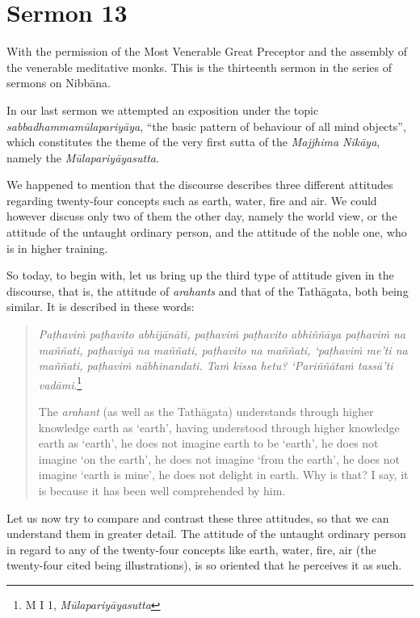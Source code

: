\chapter{Sermon 13}

\NibbanaOpeningQuote

With the permission of the Most Venerable Great Preceptor and the assembly of the venerable meditative monks. This is the thirteenth sermon in the series of sermons on Nibbāna.

In our last sermon we attempted an exposition under the topic \emph{sabbadhammamūlapariyāya}, ``the basic pattern of behaviour of all mind objects'', which constitutes the theme of the very first sutta of the \emph{Majjhima Nikāya}, namely the \emph{Mūlapariyāyasutta}.

We happened to mention that the discourse describes three different attitudes regarding twenty-four concepts such as earth, water, fire and air. We could however discuss only two of them the other day, namely the world view, or the attitude of the untaught ordinary person, and the attitude of the noble one, who is in higher training.

So today, to begin with, let us bring up the third type of attitude given in the discourse, that is, the attitude of \emph{arahants} and that of the Tathāgata, both being similar. It is described in these words:

\begin{quote}
\emph{Paṭhaviṁ paṭhavito abhijānāti, paṭhaviṁ paṭhavito abhiññāya paṭhaviṁ na maññati, paṭhaviyā na maññati, paṭhavito na maññati, `paṭhaviṁ me'ti na maññati, paṭhaviṁ nābhinandati. Taṁ kissa hetu? `Pariññātaṁ tassā'ti vadāmi}.\footnote{M I 1, \emph{Mūlapariyāyasutta}}

The \emph{arahant} (as well as the Tathāgata) understands through higher knowledge earth as `earth', having understood through higher knowledge earth as `earth', he does not imagine earth to be `earth', he does not imagine `on the earth', he does not imagine `from the earth', he does not imagine `earth is mine', he does not delight in earth. Why is that? I say, it is because it has been well comprehended by him.
\end{quote}

Let us now try to compare and contrast these three attitudes, so that we can understand them in greater detail. The attitude of the untaught ordinary person in regard to any of the twenty-four concepts like earth, water, fire, air (the twenty-four cited being illustrations), is so oriented that he perceives it as such.

